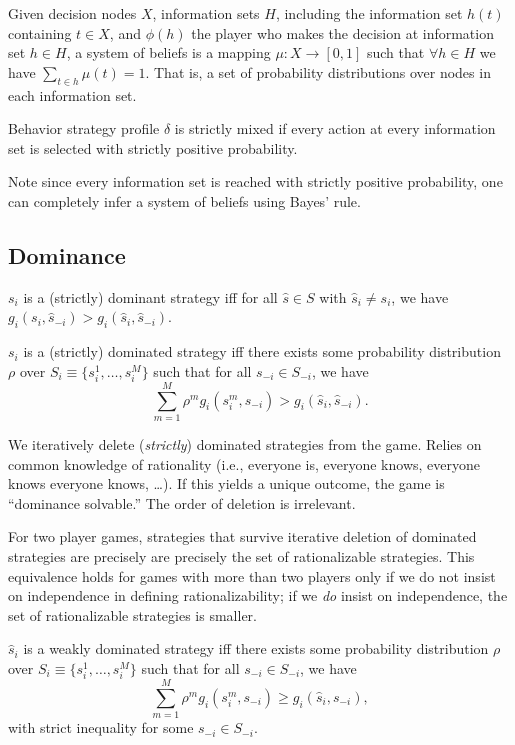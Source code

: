 \documentclass[8pt,letterpaper, landscape]{extarticle} %
\begin{document}
\begin{multicols}{3}
\begin{description}
 Given decision nodes $ X $, information sets $ H $, including the information set $ h(t) $ containing $ t \in X $, and $ \phi(h) $ the player who makes the decision at information set $ h \in H $, a system of beliefs is a mapping $ \mu \colon X \to [0,1] $ such that $ \forall h \in H $ we have $ \sum_{t \in h} \mu (t) = 1 $. That is, a set of probability distributions over nodes in each information set.

 Behavior strategy profile $ \delta $ is strictly mixed if every action at every information set is selected with strictly positive probability.

Note since every information set is reached with strictly positive probability, one can completely infer a system of beliefs using Bayes' rule.

\subsection{Dominance}
 $ s_i $ is a (strictly) dominant strategy iff for all $ \hat{s} \in S $ with $ \hat{s}_i \neq s_i $, we have $ g_i (s_i, \hat{s}_{-i}) > g_i (\hat{s}_i, \hat{s}_{-i}) $.

 $ s_i $ is a (strictly) dominated strategy iff there exists some probability distribution $ \rho $ over $ S_i \equiv \{ s_i^1 , \dotsc , s_i^M \} $ such that for all $ s_{-i} \in S_{-i} $, we have
$$ \sum_{m = 1}^{M} \rho^m g_i (s_i^m, s_{-i}) > g_i (\hat{s}_i, \hat{s}_{-i}) . $$

 We iteratively delete (\textit{strictly}) dominated strategies from the game. Relies on common knowledge of rationality (i.e., everyone is, everyone knows, everyone knows everyone knows, \ldots). If this yields a unique outcome, the game is ``dominance solvable.'' The order of deletion is irrelevant.

For two player games, strategies that survive iterative deletion of dominated strategies are precisely are precisely the set of rationalizable strategies. This equivalence holds for games with more than two players only if we do not insist on independence in defining rationalizability; if we \textit{do} insist on independence, the set of rationalizable strategies is smaller.

 $ \hat{s}_i $ is a weakly dominated strategy iff there exists some probability distribution $ \rho $ over $ S_i \equiv \{ s_i^1 , \dotsc , s_i^M \} $ such that for all $ s_{-i} \in S_{-i} $, we have
$$ \sum_{m = 1}^{M} \rho^m g_i (s_i^m, s_{-i}) \geq g_i (\hat{s}_i, s_{-i}) , $$
with strict inequality for some $ s_{-i} \in S_{-i} $.


\end{description}
\end{multicols}
\end{document}
